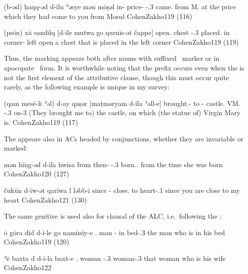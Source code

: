 {(b-əd) ḥaqq-əd d-īlu ʾəsye mən mōṣəl}
{in-\cst{} price-\cst{} \gen-\cop.3\pl{} came.\resl{} from{} M.}
{at the price which they had come to you from Mosul}
{CohenZakho}{119 (116)}

{(psōx) xā sandū́q [d-īle mutwa go qurnīs-ət čappe]}
{open.\imp{} \indef{} chest \gen-\cop.3\masc{} placed.\resl{} in corner-\cst{} left}
{open a chest that is placed in the left corner}
	{CohenZakho}{119 (119)}

Thus, the \gen* marking appears both after nouns with suffixed \cst\ marker or in apocopate \cst\ form. It is worthwhile noting that the \d prefix occurs even when the  is not the first element of the attributive clause, though this must occur quite rarely, as the following example is unique in my survey:

{(qam mesē-li ʾəl) d-ay qaṣər [maṭməryam d-īla ʾəll-e]}
{\pst{} brought.\pl-\sg{} to \gen- castle.\cst{} VM. \gen-\cop.3\fem{} on-3\masc}
{(They brought me to) the castle, on which (the statue of) Virgin Mary is.\footnotemark}
{CohenZakho}{119 (117)}


The  appears also in ACs headed by  conjunctions, whether they are invariable or \cst* marked:

{ mən hīng-əd d-īla hwīsa}
{from then-\cst{} \gen-\cop.3\fem{} born.\resl.\fem }
{from the time she was born}
{CohenZakho}{120 (127)}

{čukūn d-īw-ət qarīwa l\cb{} ləbb-i}
{since \gen-\masc{} close.\masc{} to\cb{} heart-\poss.1\sg}
{since you are close to my heart}
{CohenZakho}{121 (130)}\antipar 
\newpage 

The same genitive  is used also for clausal \secns of the ALC, i.e.\ following the \lnk*: 

{ō gōra dīd d-ī-le go namūsīy-e}
{\dem.\masc{} man \lnkd{} \gen-\masc{} in bed-\poss.3\masc}
{the man who is in his bed}
{CohenZakho}{119 (120)}

{ʾē baxta d\cb{} d-ī-la baxt-e}
{\dem.\fem{} woman \lnk\cb{} \gen-\cop.3\fem{} woman-\poss.3\masc}
{that woman who is his wife}
{CohenZakho}{122}

